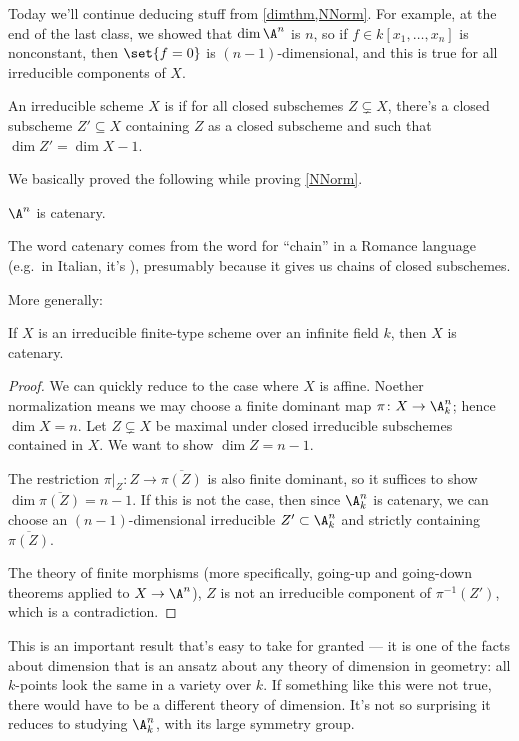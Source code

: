 Today we'll continue deducing stuff from \cref{dimthm,NNorm}. For example, at the end of the last class, we showed
that $\dim\A^n$ is $n$, so if $f\in k[x_1,\dotsc,x_n]$ is nonconstant, then $\set{f = 0}$ is $(n-1)$-dimensional,
and this is true for all irreducible components of $X$.
\begin{defn}
An irreducible scheme $X$ is  if for all closed subschemes $Z\subsetneq X$, there's a closed
subscheme $Z'\subseteq X$ containing $Z$ as a closed subscheme and such that $\dim Z' = \dim X - 1$.
\end{defn}
We basically proved the following while proving \cref{NNorm}.
\begin{cor}
$\A^n$ is catenary.
\end{cor}
\begin{rem}
The word catenary comes from the word for ``chain'' in a Romance language (e.g.\ in Italian, it's ),
presumably because it gives us chains of closed subschemes.
\end{rem}
More generally:
\begin{cor}
\label{catenary}
If $X$ is an irreducible finite-type scheme over an infinite field $k$, then $X$ is catenary.
\end{cor}
\begin{proof}
We can quickly reduce to the case where $X$ is affine. Noether normalization means we may choose a finite dominant
map $\pi\colon X\to\A_k^n$; hence $\dim X = n$. Let $Z\subsetneq X$ be maximal under closed irreducible subschemes
contained in $X$. We want to show $\dim Z = n-1$.

The restriction $\pi|_Z\colon Z\to\overline{\pi(Z)}$ is also finite dominant, so it suffices to show
$\dim\overline{\pi(Z)} = n-1$. If this is not the case, then since $\A_k^n$ is catenary, we can choose an
$(n-1)$-dimensional irreducible $Z'\subset\A_k^n$ and strictly containing $\overline{\pi(Z)}$.

The theory of finite morphisms (more specifically, going-up and going-down theorems applied to $X\to\A^n$), $Z$ is
not an irreducible component of $\pi^{-1}(Z')$, which is a contradiction.
\end{proof}
This is an important result that's easy to take for granted --- it is one of the facts about dimension that is an
ansatz about any theory of dimension in geometry: all $k$-points look the same in a variety over $k$. If something
like this were not true, there would have to be a different theory of dimension. It's not so surprising it reduces
to studying $\A_k^n$, with its large symmetry group.

